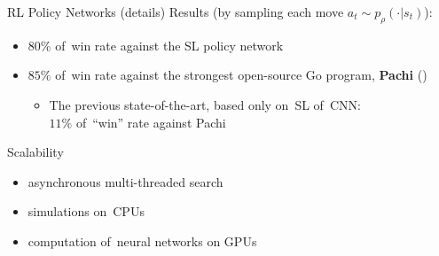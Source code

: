 \documentclass{beamer}
\begin{document}
{    \begin{frame}{RL Policy Networks (details)}
      Results (by sampling each move $a_t \sim p_\rho(\cdot | s_t)$):
      \pause
      \begin{itemize}[<+- | alert@+>]
        \item $80\%$ of~win rate against the SL policy network
        \item $85\%$ of~win rate against the strongest open-source Go program, \textbf{Pachi} (\cite{Baudivs2011pachi})
          \begin{itemize}[<+- | alert@+>]
            \item The previous state-of-the-art, based only on~SL of~CNN: \\
              \pause
              $11\%$ of~``win'' rate against Pachi
          \end{itemize}
      \end{itemize}
    \end{frame}


    \begin{frame}{Scalability}
      \begin{itemize}
        \item asynchronous multi-threaded search
        \item simulations on~CPUs
        \item computation of~neural networks on GPUs
      \end{itemize}
      \pause


\end{frame}}
\end{document}
